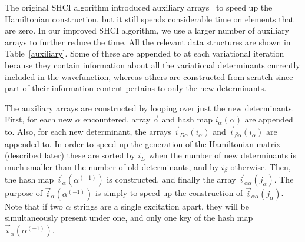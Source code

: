 \documentclass[%
reprint,
 superscriptaddress,
 amsmath,amssymb,
 aps,
]{revtex4-1}
\def\veca{\vec{\alpha}}
\def\vecb{\vec{\beta}}
\def\ia{i_\alpha}
\def\ib{i_\beta}
\def\vecia{\vec{i}_\alpha}
\def\veciDa{\vec{i}_{D\alpha}}
\def\veciaa{\vec{i}_{\alpha\alpha}}
\def\veciba{\vec{i}_{\beta\alpha}}
\begin{document}
The original SHCI algorithm introduced
auxiliary arrays~\cite{ShaHolJeaAlaUmr-JCTC-17} to speed up the Hamiltonian construction,
but it still spends considerable time on elements that are zero.
In our improved SHCI algorithm, we use a larger number of auxiliary arrays to further reduce the time.
All the relevant data structures are shown in Table~\ref{auxiliary}.
Some of these are appended to at each variational iteration because they contain information about all the variational determinants
currently included in the wavefunction, whereas others are constructed from scratch since part of their information content
pertains to only the new determinants.

The auxiliary arrays are constructed by looping over just the new determinants.
First, for each new $\alpha$ encountered, array $\veca$ and hash map $\ia(\alpha)$ are appended to.
Also, for each new determinant, the arrays $\veciDa(\ia)$ and $\veciba(\ia)$ are appended to.
In order to speed up the generation of the Hamiltonian matrix (described later) these
are sorted by $i_D$ when the number of new determinants is much smaller than the number of old determinants,
and by $\ib$
otherwise.
Then, the hash map $\vecia(\alpha^{(-1)})$ is constructed, and finally the array $\veciaa(j_\alpha)$.
The purpose of $\vecia(\alpha^{(-1)})$ is simply to speed up the construction of $\veciaa(j_\alpha)$.
Note that if two $\alpha$ strings are a single excitation apart, they will be simultaneously present under one, and only one key of the hash map $\vecia(\alpha^{(-1)})$.
\end{document}
